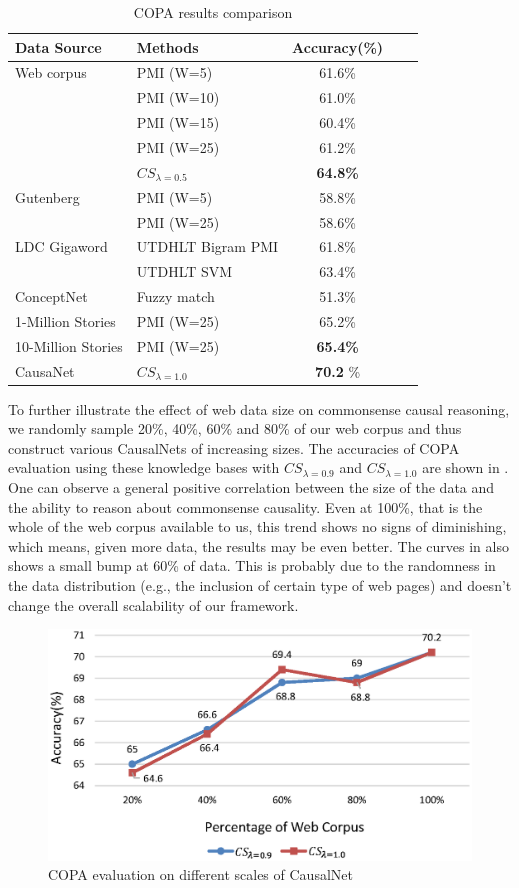 \begin{table}[th]
\small
\centering
\caption{COPA results comparison}
\label{tab:evaluation}
\begin{tabular}{llccc}
\hline
Data Source & Methods & Accuracy(\%) \\
\hline
Web corpus & PMI (W=5) & 61.6\% \\
& PMI (W=10) & 61.0\% \\
& PMI (W=15) & 60.4\% \\
& PMI (W=25) & 61.2\% \\
& {\bf $CS_{\lambda=0.5}$} & {\bf 64.8\%} \\
\hline
Gutenberg & PMI (W=5)  & 58.8\% \\
& PMI (W=25) & 58.6\% \\
\hline
LDC Gigaword & UTDHLT Bigram PMI & 61.8\% \\
 & UTDHLT SVM & 63.4\% \\
\hline
ConceptNet & Fuzzy match & 51.3\% \\
\hline
1-Million Stories & PMI (W=25) & 65.2\% \\
10-Million Stories & PMI (W=25) & {\bf 65.4\%} \\ \hline
CausaNet & {\bf $CS_{\lambda = 1.0}$ } & {\bf 70.2} \%  \\
\hline
\end{tabular}
\end{table}

To further illustrate the effect of web data size on
commonsense causal reasoning, we randomly sample
20\%, 40\%, 60\% and 80\% of our web corpus and thus construct
various CausalNets of increasing sizes. The accuracies of
COPA evaluation using these knowledge bases with $CS_{\lambda=0.9}$
and $CS_{\lambda=1.0}$ are shown in .
One can observe a general positive correlation between the size of the data
and the ability to reason about commonsense causality. Even at 100\%,
that is the whole of the web corpus available to us, this trend shows
no signs of diminishing, which means, given more data, the results may be
even better. The curves in  also shows a
small bump at 60\% of data.
This is probably due to the randomness in the data distribution (e.g., the
inclusion of certain type of web pages) and doesn't change the overall
scalability of our framework.

\begin{figure}[htb]
\centering
\includegraphics[width=0.9\columnwidth]{causalnet_scales}
\caption{COPA evaluation on different scales of CausalNet}
\label{fig:scale}
\end{figure}

